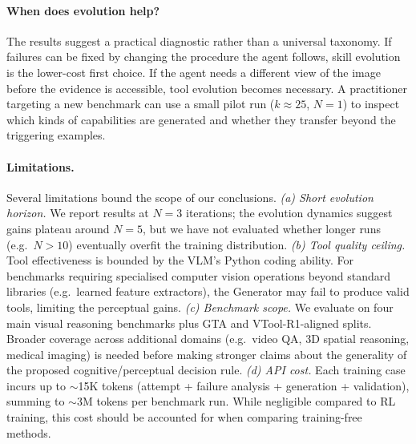 \label{sec:discussion}

\paragraph{When does evolution help?}
The results suggest a practical diagnostic rather than a universal taxonomy. If failures can be
fixed by changing the procedure the agent follows, skill evolution is the lower-cost first
choice. If the agent needs a different view of the image before the evidence is accessible,
tool evolution becomes necessary. A practitioner targeting a new benchmark can use a small pilot
run ($k{\approx}25$, $N{=}1$) to inspect which kinds of capabilities are generated and whether
they transfer beyond the triggering examples.

\paragraph{Limitations.}
Several limitations bound the scope of our conclusions.
\textit{(a) Short evolution horizon.}
We report results at $N{=}3$ iterations; the evolution dynamics suggest gains plateau
around $N{=}5$, but we have not evaluated whether longer runs (e.g.\ $N{>}10$) eventually
overfit the training distribution.
\textit{(b) Tool quality ceiling.}
Tool effectiveness is bounded by the VLM's Python coding ability.
For benchmarks requiring specialised computer vision operations beyond standard libraries
(e.g.\ learned feature extractors), the Generator may fail to produce valid tools, limiting
the perceptual gains.
\textit{(c) Benchmark scope.}
We evaluate on four main visual reasoning benchmarks plus GTA and VTool-R1-aligned splits.
Broader coverage across additional domains (e.g.\ video QA, 3D spatial reasoning, medical
imaging) is needed before making stronger claims about the generality of the proposed
cognitive/perceptual decision rule.
\textit{(d) API cost.}
Each training case incurs up to $\sim$15K tokens (attempt + failure analysis + generation +
validation), summing to $\sim$3M tokens per benchmark run.  While negligible compared to RL
training, this cost should be accounted for when comparing training-free methods.

